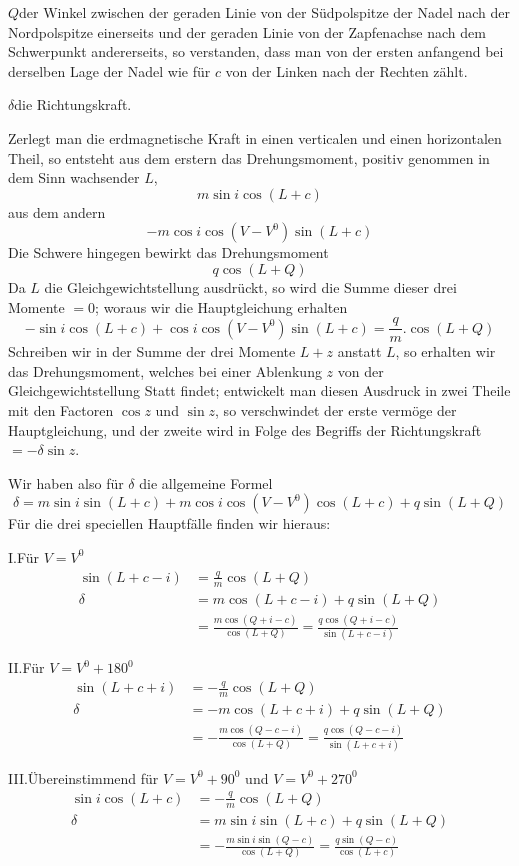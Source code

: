 $Q$\quad der Winkel zwischen der geraden Linie von der Südpolspitze der Nadel nach der Nordpolspitze einerseits und der geraden Linie von der Zapfenachse nach dem Schwerpunkt andererseits, so verstanden, dass man von der ersten anfangend bei derselben Lage der Nadel wie für $c$ von der Linken nach der Rechten zählt.

$\delta$\quad die Richtungskraft.

Zerlegt man die erdmagnetische Kraft in einen verticalen und einen horizontalen Theil, so entsteht aus dem erstern das Drehungsmoment, positiv genommen in dem Sinn wachsender $L$,
\[
m\sin i\cos(L+c)
\]
aus dem andern
\[
-m\cos i\cos(V-V^0)\sin(L+c)
\]
Die Schwere hingegen bewirkt das Drehungsmoment
\[
q\cos(L+Q)
\]
Da $L$ die Gleichgewichtstellung ausdrückt, so wird die Summe dieser drei Momente $=0$; woraus wir die Hauptgleichung erhalten
\[
-\sin i\cos(L+c)+\cos i\cos(V-V^0)\sin(L+c)=\frac{q}{m}.\cos(L+Q)
\]
Schreiben wir in der Summe der drei Momente $L+z$ anstatt $L$, so erhalten wir das Drehungsmoment, welches bei einer Ablenkung $z$ von der Gleichgewichtstellung Statt findet; entwickelt man diesen Ausdruck in zwei Theile mit den Factoren $\cos z$ und $\sin z$, so verschwindet der erste vermöge der Hauptgleichung, und der zweite wird in Folge des Begriffs der Richtungskraft $=-\delta\sin z$.
\par\clearpage
{}
\noindent Wir haben also für $\delta$ die allgemeine Formel
\[
\delta=m\sin i\sin(L+c)+m\cos i\cos(V-V^0)\cos(L+c)+q\sin(L+Q)
\]
Für die drei speciellen Hauptfälle finden wir hieraus:

I.\quad Für $V=V^0$
\[
\begin{aligned}
\sin(L+c-i)&=\frac{q}{m}\cos(L+Q)\\
\delta&=m\cos(L+c-i)+q\sin(L+Q)\\
&=\frac{m\cos(Q+i-c)}{\cos(L+Q)}=\frac{q\cos(Q+i-c)}{\sin(L+c-i)}
\end{aligned}
\]

II.\quad Für $V=V^0+180^0$
\[
\begin{aligned}
\sin(L+c+i)&=-\frac{q}{m}\cos(L+Q)\\
\delta&=-m\cos(L+c+i)+q\sin(L+Q)\\
&=-\frac{m\cos(Q-c-i)}{\cos(L+Q)}=\frac{q\cos(Q-c-i)}{\sin(L+c+i)}
\end{aligned}
\]

III.\quad Übereinstimmend für $V=V^0+90^0$ und $V=V^0+270^0$
\[
\begin{aligned}
\sin i\cos(L+c)&=-\frac{q}{m}\cos(L+Q)\\
\delta&=m\sin i\sin(L+c)+q\sin(L+Q)\\
&=-\frac{m\sin i\sin(Q-c)}{\cos(L+Q)}=\frac{q\sin(Q-c)}{\cos(L+c)}
\end{aligned}
\]

